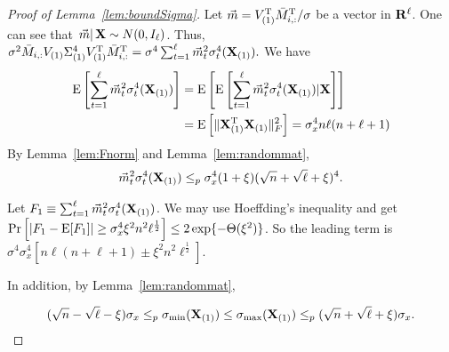 \begin{proof}[Proof of Lemma~\ref{lem:boundSigma}]
Let $\vec m = V^{\mathrm{T}}_{(1)}\bar M^{\mathrm{T}}_{i,:}/\sigma$ be a vector in $\mathbf{R}^{\ell}$. One can see that $\left. \vec m  \right| \mathbf{X} \sim N(0,  I_{\ell})$. Thus, $\sigma^2\bar M_{i,:}V_{(1)}\Sigma^4_{(1)}V^{\mathrm{T}}_{(1)}\bar M^{\mathrm{T}}_{i,:}
    =\sigma^4 \sum^{\ell}_{t = 1}\vec m^2_{t}\sigma^4_{t}(\mathbf{X}_{(1)}).$ 
We have
{\small
\begin{equation}
\begin{split}
    \mathrm{E} \left[\sum^{\ell}_{t = 1}\vec m^2_{t}\sigma^4_{t}(\mathbf{X}_{(1)})\right]
    &=  \mathrm{E} \left[\mathrm{E}\left[\sum^{\ell}_{t = 1}\vec m^2_{t}\sigma^4_{t}(\mathbf{X}_{(1)})|\mathbf{X}\right]\right]  \\ 
    &= \mathrm{E} \left[\|\mathbf{X}_{(1)}^{\mathrm{T}}\mathbf{X}_{(1)}   \|^2_F \right]   
    = \sigma^4_x n\ell(n + \ell +1)
\end{split}
\end{equation}
}
By Lemma~\ref{lem:Fnorm} and Lemma~\ref{lem:randommat},
\begin{equation}
    \vec m^2_{t}\sigma^4_{t}(\mathbf{X}_{(1)})
    \leq_p  \sigma^4_x (1+\xi)(\sqrt{n}+\sqrt{\ell}+\xi)^4.
\end{equation}

Let $F_1 \equiv \sum^{\ell}_{t = 1}\vec m^2_{t}\sigma^4_{t}(\mathbf{X}_{(1)})$. We may use Hoeffding's inequality and get $\Pr\left[\left|F_1 - \mathrm{E}[F_1] \right|\geq \sigma^4_x\xi^2 n^2 \ell^{\frac{1}{2}}
    \right] \leq 2\exp\{-\Theta(\xi^2)\}$. 
So the leading term is $\sigma^4\sigma^4_x[n\ell(n + \ell +1) \pm \xi^2 n^2 \ell^{\frac{1}{2}}]$.


\iffalse
\begin{equation}
\begin{split}
    &\Pr\left[\left|F_1 - \E[F_1] \right|\geq \sigma^4_x\xi^2 \ell^{\frac{5}{2}}
    \right] \\
    \leq& 2 \exp \left(-\frac{2\xi^4\ell^5}{\ell(1+\xi)^2(\sqrt{n}+\sqrt{\ell}+\xi)^8 } \right) \\ 
    =&  2\exp\{-\Theta(\xi^2)\}
\end{split}
\end{equation}
\fi
    
\iffalse
In addition, by Lemma~\ref{lem:randommat}, 

\begin{equation}\label{eqn:extreme}
(\sqrt{n} - \sqrt{\ell} - \xi)\sigma_x \leq_p \sigma_{\min}(\mathbf{X}_{(1)}) \leq \sigma_{\max}(\mathbf{X}_{(1)}) \leq_p (\sqrt{n} + \sqrt{\ell} + \xi)\sigma_x. 
\end{equation}


\end{proof}
